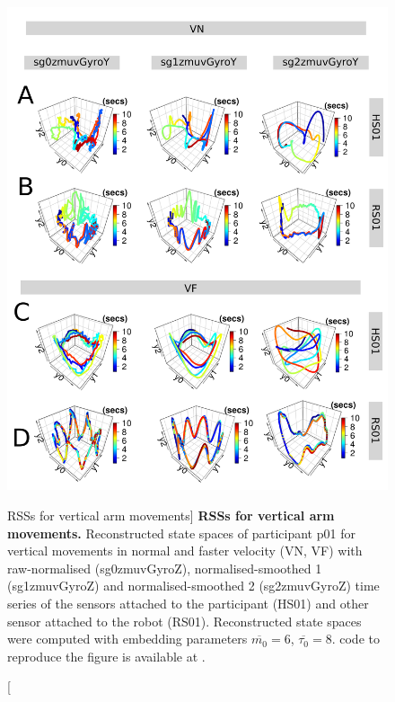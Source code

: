 \begin{figure}
\centering
\includegraphics[height=0.85\textheight]{fig_6_05}
    \caption
	[RSSs for vertical arm movements]{
	{\bf RSSs for vertical arm movements.}
	Reconstructed state spaces %
	of participant p01 for vertical movements in normal and faster 
	velocity (VN, VF) with raw-normalised (sg0zmuvGyroZ), 
	normalised-smoothed 1 (sg1zmuvGyroZ) and 
	normalised-smoothed 2 (sg2zmuvGyroZ) time series of the 
	sensors attached to the participant (HS01) and other sensor 
	attached to the robot (RS01).	
	Reconstructed state spaces were computed with 
	embedding parameters $\overline{m_0}=6$, $\overline{\tau_0}=8$.
	\R code to reproduce the figure is available at 
	.
        }
    \label{fig:rss_aVw10}
\end{figure}

